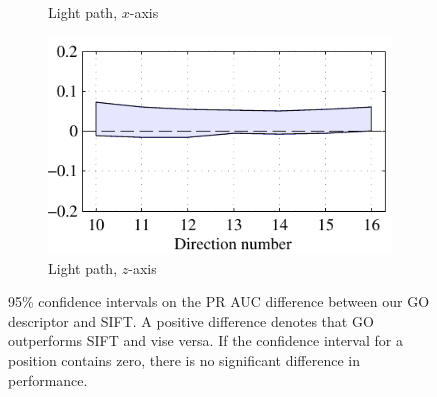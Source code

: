 \documentclass[thesis.tex]{subfiles}
\begin{document}
\begin{figure}[tb]
{\begin{subfigure}[t]{0.6242\textwidth}
		\caption{Light path, $x$-axis}
	\end{subfigure}
	\begin{subfigure}[t]{0.5618\textwidth}
		\includegraphics[width=\textwidth]{img/dtuResultsStatsGo_Sift_6.pdf}
		\caption{Light path, $z$-axis}
	\end{subfigure}
	}
	\caption{95\% confidence intervals on the PR AUC difference between our GO descriptor and SIFT. A positive difference denotes that GO outperforms SIFT and vise versa. If the confidence interval for a position contains zero, there is no significant difference in performance.}
	\label{fig:dtuResultsStatsGo_Sift}
\end{figure}
\end{document}
